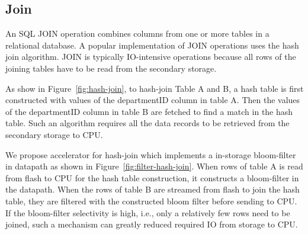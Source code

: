 \documentclass{article}
\begin{document}
\subsection{Join}
An SQL JOIN operation combines columns from one or more tables in a relational database.
A popular implementation of JOIN operations uses the hash join algorithm.
JOIN is typically IO-intensive operations because all rows of the joining tables have to be read from the secondary storage.

As show in Figure~\ref{fig:hash-join}, to hash-join Table A and B, a hash table is first constructed with values of the departmentID column in table A.
Then the values of the departmentID column in table B are fetched to find a match in the hash table.
Such an algorithm requires all the data records to be retrieved from the secondary storage to CPU.

We propose accelerator for hash-join which implements a in-storage bloom-filter in datapath as shown in Figure~\ref{fig:filter-hash-join}.
When rows of table A is read from flash to CPU for the hash table construction, it constructs a bloom-filter in the datapath.
When the rows of table B are streamed from flash to join the hash table, they are filtered with the constructed bloom filter before sending to CPU.
If the bloom-filter selectivity is high, i.e., only a relatively few rows need to be joined, such a mechanism can greatly reduced required IO from storage to CPU.
\end{document}
